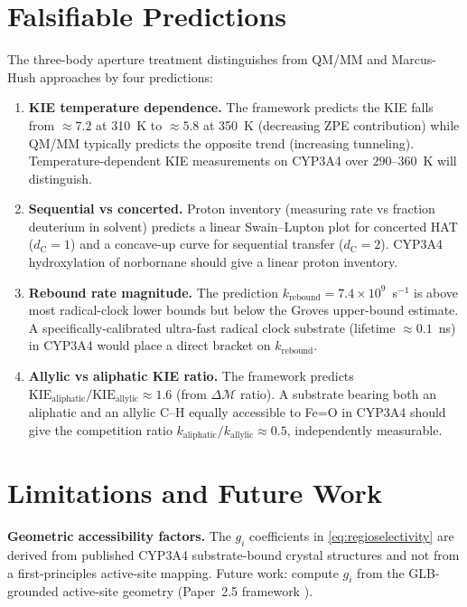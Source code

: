 \documentclass[11pt,twocolumn,a4paper]{article}
\theoremstyle{definition}
\theoremstyle{remark}
\newcommand{\depth}{\mathcal{M}}
\newcommand{\dC}{d_{\mathrm{C}}}
\newcommand{\krebound}{k_{\mathrm{rebound}}}
\newcommand{\KIEval}{\mathrm{KIE}}
\begin{document}
\section{Falsifiable Predictions}
\label{sec:falsifiable}

The three-body aperture treatment distinguishes from QM/MM and Marcus-Hush
approaches by four predictions:

\begin{enumerate}[leftmargin=*, nosep]
\item \textbf{KIE temperature dependence.} The framework predicts the KIE
  falls from $\approx 7.2$ at 310~K to $\approx 5.8$ at 350~K (decreasing
  ZPE contribution) while QM/MM typically predicts the opposite trend
  (increasing tunneling). Temperature-dependent KIE measurements on CYP3A4
  over $290$--$360$~K will distinguish.

\item \textbf{Sequential vs concerted.} Proton inventory (measuring rate vs
  fraction deuterium in solvent) predicts a linear Swain--Lupton plot for
  concerted HAT ($\dC = 1$) and a concave-up curve for sequential transfer
  ($\dC = 2$). CYP3A4 hydroxylation of norbornane should give a linear
  proton inventory.

\item \textbf{Rebound rate magnitude.} The prediction $\krebound = 7.4 \times
  10^9$~s$^{-1}$ is above most radical-clock lower bounds but below the
  Groves upper-bound estimate. A specifically-calibrated ultra-fast radical
  clock substrate (lifetime $\approx 0.1$~ns) in CYP3A4 would place a
  direct bracket on $\krebound$.

\item \textbf{Allylic vs aliphatic KIE ratio.} The framework predicts
  $\KIEval_{\mathrm{aliphatic}} / \KIEval_{\mathrm{allylic}} \approx 1.6$
  (from $\Delta\depth$ ratio). A substrate bearing both an aliphatic and an
  allylic C--H equally accessible to Fe=O in CYP3A4 should give the
  competition ratio $k_{\mathrm{aliphatic}} / k_{\mathrm{allylic}} \approx 0.5$,
  independently measurable.
\end{enumerate}

\section{Limitations and Future Work}
\label{sec:limits}

\textbf{Geometric accessibility factors.} The $g_i$ coefficients in
\cref{eq:regioselectivity} are derived from published CYP3A4 substrate-bound
crystal structures \citep{yano2004} and not from a first-principles active-site
mapping. Future work: compute $g_i$ from the GLB-grounded active-site
geometry (Paper~2.5 framework \citep{sachikonye2025_paper25}).
\end{document}
